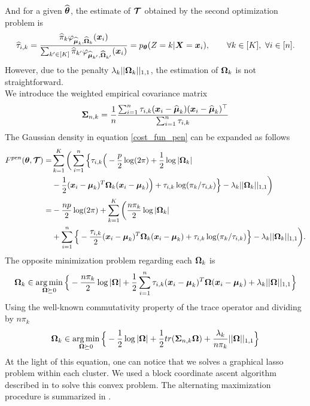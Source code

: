 And for a given $\widehat{{\boldsymbol\theta}}$, the estimate of $\boldsymbol{\mathcal T}$ obtained by the second optimization problem is
\begin{equation}
\label{em-sols-tau}
\widehat\tau_{i,k} = \frac{\widehat\pi_k\varphi_{\widehat{\boldsymbol\mu}_k,\widehat{\boldsymbol\Omega}_k}(\boldsymbol x_i)}{\sum_{k'\in[K]}\widehat\pi_{k'}\varphi_{\widehat{\boldsymbol\mu}_{k'},\widehat{\boldsymbol\Omega}_{k'}}(\boldsymbol x_i)}=p_{{\boldsymbol\theta}}(Z=k|\boldsymbol X=\boldsymbol x_i),\qquad\forall k\in[K],\ \forall i\in[n].
\end{equation}
However, due to the penalty $\lambda_k||\boldsymbol\Omega_k||_{1,1}$, the estimation of $\boldsymbol\Omega_k$ is not straightforward.\\
We introduce the weighted empirical covariance matrix
\begin{equation}
\boldsymbol\Sigma_{n,k} = \frac{1}{n}\frac{\sum_{i=1}^n\tau_{i,k}(\boldsymbol x_i-\widehat{\boldsymbol\mu}_k)(\boldsymbol x_i-\widehat{\boldsymbol\mu}_k)^\top}{\sum_{i=1}^n\tau_{i,k}}
\end{equation}
The Gaussian density in equation \eqref{cost_fun_pen} can be expanded as follows
\begin{align*}
\label{cost_fun_pen_2}
F^{pen}({\boldsymbol\theta},\boldsymbol{\mathcal T})  =& \sum_{k=1}^K \bigg( \sum_{i=1}^{n}\Big\{ \tau_{i,k} \Big(
-\frac{p}{2}\log(2\pi)+\frac{1}{2}\log|\boldsymbol\Omega_k|\\
&-\frac{1}{2}(\boldsymbol x_i-\boldsymbol\mu_k)^T\boldsymbol\Omega_k(\boldsymbol x_i-\boldsymbol\mu_k) \Big)+\tau_{i,k} \log(\pi_k/\tau_{i,k})\Big\} -\lambda_k||\boldsymbol\Omega_k||_{1,1}\bigg)\\
=& -\frac{np}{2}\log(2\pi)+\sum_{k=1}^K \bigg(\frac{n\pi_k}{2}\log|\boldsymbol\Omega_k|\\
&+\sum_{i=1}^{n}\Big\{ -\frac{\tau_{i,k}}{2}(\boldsymbol x_i-\boldsymbol\mu_k)^T\boldsymbol\Omega_k(\boldsymbol x_i-\boldsymbol\mu_k)+\tau_{i,k} \log(\pi_k/\tau_{i,k})\Big\} -\lambda_k||\boldsymbol\Omega_k||_{1,1}\bigg). 
\end{align*}
The opposite minimization problem regarding each $\boldsymbol\Omega_k$ is
\begin{equation}
\boldsymbol\Omega_k \in \operatorname*{arg\,min}_{ \boldsymbol\Omega\succeq 0}\Big\{-\frac{n\pi_k}{2}\log|\boldsymbol\Omega|+\frac{1}{2}\sum_{i=1}^{n}\tau_{i,k}(\boldsymbol x_i-\boldsymbol\mu_k)^T\boldsymbol\Omega(\boldsymbol x_i-\boldsymbol\mu_k)+\lambda_k||\boldsymbol\Omega||_{1,1}\Big\}
\end{equation}
Using the well-known commutativity property of the trace operator and dividing by $n\pi_k$
\begin{equation}
\boldsymbol\Omega_k \in \operatorname*{arg\,min}_{ \boldsymbol\Omega\succeq 0} \Big\{ -\frac{1}{2}\log|\boldsymbol\Omega| +\frac{1}{2} tr(\boldsymbol\Sigma_{n,k}\boldsymbol\Omega)+\frac{\lambda_k}{n\pi_k}||\boldsymbol\Omega||_{1,1}\Big\}
\end{equation}
At the light of this equation, one can notice that we solves a graphical lasso problem within each cluster. We used a block coordinate ascent algorithm described in \citep{mazum_lasso} to solve this convex problem. The alternating maximization procedure is summarized in .
